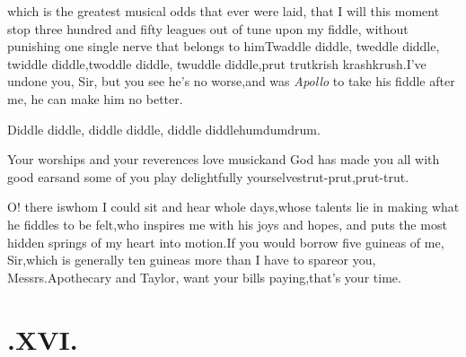 \documentclass{article}
\begin{document}
\noindent
{}
which is the greatest musical odds that ever were laid, that I will this moment stop three hundred and fifty
leagues out of tune upon my fiddle, without punish\-ing one single nerve that
belongs to him\break\tsk Twaddle diddle, tweddle
diddle,\tsk\break
twiddle diddle,\tsk twoddle diddle,\tsk\break
twuddle diddle,\tsh prut trut\tsk krish\tsk\break
krash\tsk krush.\tsk I’ve undone you, Sir,\break
\tsk but you see he’s no worse,\tsk and was \textit{Apollo} to take
his fiddle after me, he can make him no better.


Diddle diddle, diddle diddle, diddle\break
diddle\tsk hum\tsk dum\tsk drum.


\tsk Your worships and your reverences love musick\tsk and
God has made you all with good ears\tsk and some of you play
delightfully yourselves\tsk trut-prut,\tsk prut-trut.

O! there is\tsk whom I could sit and hear whole
days,\tsk whose talents lie in making what he fiddles to be
felt,\tsk who inspires me with his joys and hopes, and puts the
most hidden springs of my heart into\break
motion.\tsh If you would
borrow five guineas of me, Sir,\tsk which is generally ten
guineas more than I have to spare\tsk or you, Messrs.\@ Apothecary
and Taylor, want your bills paying,\tsk that’s your\break
time.

\section{.\enspace  XVI.}
\end{document}
